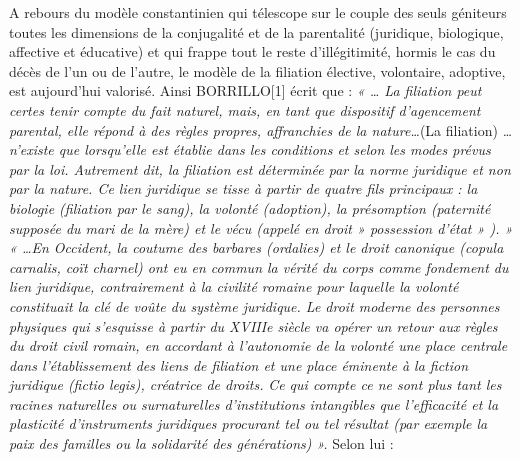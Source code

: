 A rebours du modèle constantinien qui télescope sur le couple des seuls géniteurs toutes les dimensions de la conjugalité et de la parentalité (juridique, biologique, affective et éducative) et qui frappe tout le reste d'illégitimité, hormis le cas du décès de l'un ou de l'autre, le modèle de la filiation élective, volontaire, adoptive, est aujourd'hui valorisé. 
 Ainsi BORRILLO[1] écrit que : \emph{« … La filiation peut certes tenir compte du fait naturel, mais, en tant que dispositif d'agencement parental, elle répond à des règles propres, affranchies de la nature…}(La filiation)\emph{ …n'existe que lorsqu'elle est établie dans les conditions et selon les modes prévus par la loi. Autrement dit, la filiation est déterminée par la norme juridique et non par la nature. Ce lien juridique se tisse à partir de quatre fils principaux : la biologie (filiation par le sang), la volonté (adoption), la présomption (paternité supposée du mari de la mère) et le vécu (appelé en droit » possession d'état » ). »}
 \emph{« …En Occident, la coutume des barbares (ordalies) et le droit canonique (copula carnalis, coït charnel) ont eu en commun la vérité du corps comme fondement du lien juridique, contrairement à la civilité romaine pour laquelle la volonté constituait la clé de voûte du système juridique. Le droit moderne des personnes physiques qui s'esquisse à partir du XVIIIe siècle va opérer un retour aux règles du droit civil romain, en accordant à l'autonomie de la volonté une place centrale dans l'établissement des liens de filiation et une place éminente à la fiction juridique (fictio legis), créatrice de droits.}
 \emph{Ce qui compte ce ne sont plus tant les racines naturelles ou surnaturelles d'institutions intangibles que l'efficacité et la plasticité d'instruments juridiques procurant tel ou tel résultat (par exemple la paix des familles ou la solidarité des générations) ».}
 Selon lui :
